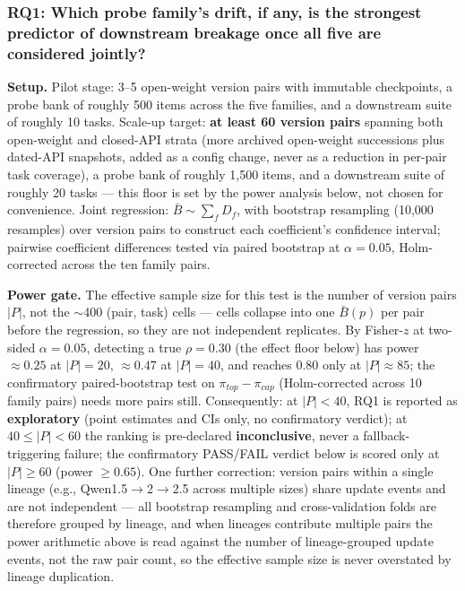 \documentclass[11pt]{article}
\begin{document}
\subsubsection{RQ1: Which probe family's drift, if any, is the strongest predictor of downstream breakage once all five are considered jointly?}
\textbf{Setup.} Pilot stage: 3--5 open-weight version pairs with immutable checkpoints, a probe bank of roughly 500 items across the five families, and a downstream suite of roughly 10 tasks. Scale-up target: \textbf{at least 60 version pairs} spanning both open-weight and closed-API strata (more archived open-weight successions plus dated-API snapshots, added as a config change, never as a reduction in per-pair task coverage), a probe bank of roughly 1,500 items, and a downstream suite of roughly 20 tasks --- this floor is set by the power analysis below, not chosen for convenience. Joint regression: $\bar{B} \sim \sum_f D_f$, with bootstrap resampling (10,000 resamples) over version pairs to construct each coefficient's confidence interval; pairwise coefficient differences tested via paired bootstrap at $\alpha = 0.05$, Holm-corrected across the ten family pairs.

\textbf{Power gate.} The effective sample size for this test is the number of version pairs $|P|$, not the $\sim$400 (pair, task) cells --- cells collapse into one $\bar{B}(p)$ per pair before the regression, so they are not independent replicates. By Fisher-$z$ at two-sided $\alpha=0.05$, detecting a true $\rho = 0.30$ (the effect floor below) has power $\approx 0.25$ at $|P|=20$, $\approx 0.47$ at $|P|=40$, and reaches $0.80$ only at $|P|\approx 85$; the confirmatory paired-bootstrap test on $\pi_{top}-\pi_{cap}$ (Holm-corrected across 10 family pairs) needs more pairs still. Consequently: at $|P| < 40$, RQ1 is reported as \textbf{exploratory} (point estimates and CIs only, no confirmatory verdict); at $40 \leq |P| < 60$ the ranking is pre-declared \textbf{inconclusive}, never a fallback-triggering failure; the confirmatory PASS/FAIL verdict below is scored only at $|P| \geq 60$ (power $\geq 0.65$). One further correction: version pairs within a single lineage (e.g., Qwen1.5$\to$2$\to$2.5 across multiple sizes) share update events and are not independent --- all bootstrap resampling and cross-validation folds are therefore grouped by lineage, and when lineages contribute multiple pairs the power arithmetic above is read against the number of lineage-grouped update events, not the raw pair count, so the effective sample size is never overstated by lineage duplication.
\end{document}
